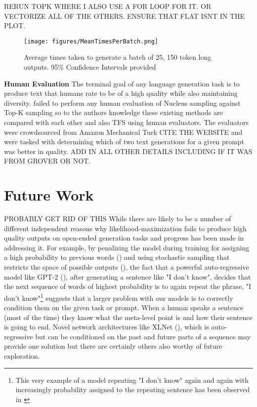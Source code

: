 \documentclass{article}
\begin{document}
RERUN TOPK WHERE I ALSO USE A FOR LOOP FOR IT. OR VECTORIZE ALL OF THE OTHERS. ENSURE THAT FLAT ISNT IN THE PLOT. 

\begin{figure}[h]
    \texttt{[image: figures/MeanTimesPerBatch.png]}
    \caption{Average times taken to generate a batch of 25, 150 token long outputs. 95\% Confidence Intervals provided}
    \label{fig:MeanTimes}
\end{figure}

\textbf{Human Evaluation} 
The terminal goal of any language generation task is to produce text that humans rate to be of a high quality while also maintaining diversity. \cite{Nucleus} failed to perform any human evaluation of Nucleus sampling against Top-K sampling so to the authors knowledge these existing methods are compared with each other and also TFS using human evaluators. The evaluators were crowdsourced from Amazon Mechanical Turk CITE THE WEBSITE and were tasked with determining which of two text generations for a given prompt was better in quality. ADD IN ALL OTHER DETAILS INCLUDING IF IT WAS FROM GROVER OR NOT. 

\section{Future Work} PROBABLY GET RID OF THIS
While there are likely to be a number of different independent reasons why likelihood-maximization fails to produce high quality outputs on open-ended generation tasks and progress has been made in addressing it. For example, by penalizing the model during training for assigning a high probability to previous words (\cite{UnLikelihood}) and using stochastic sampling that restricts the space of possible outputs (\cite{Nucleus}), the fact that a powerful auto-regressive model like GPT-2 (\cite{radford2019language}), after generating a sentence like "I don't know", decides that the next sequence of words of highest probability is to again repeat the phrase, "I don't know"\footnote{This very example of a model repeating "I don't know" again and again with increasingly probability assigned to the repeating sentence has been observed in \cite{Nucleus}} suggests that a larger problem with our models is to correctly condition them on the given task or prompt. When a human speaks a sentence (most of the time) they know what the meta-level point is and how their sentence is going to end. Novel network architectures like XLNet (\cite{XLNet}), which is auto-regressive but can be conditioned on the past and future parts of a sequence may provide one solution but there are certainly others also worthy of future exploration. 
\end{document}
